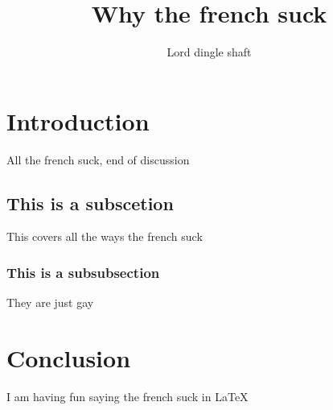 \documentclass{article}
\title{Why the french suck}
\author{Lord dingle shaft}
\begin{document}
\maketitle

\section{Introduction}
All the french suck, end of discussion

\subsection{This is a subscetion}
This covers all the ways the french suck

\subsubsection{This is a subsubsection}
They are just gay

\section{Conclusion}
I am having fun saying the french suck in \LaTeX
\end{document}
